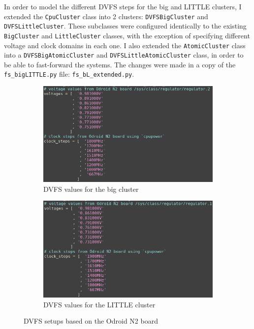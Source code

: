     In order to model the different DVFS steps for the big and LITTLE clusters,
    I extended the \texttt{CpuCluster} class into 2 clusters: 
    \texttt{DVFSBigCluster} and \texttt{DVFSLittleCluster}. These subclasses 
    were configured identically to the existing \texttt{BigCluster} and 
    \texttt{LittleCluster} classes, with the exception of specifying different 
    voltage and clock domains in each one. I also extended the 
    \texttt{AtomicCluster} class into a \texttt{DVFSBigAtomicCluster} and 
    \texttt{DVFSLittleAtomicCluster} class, in order to be able to fast-forward 
    the systems. The changes were made in a copy of the 
    \texttt{fs\_bigLITTLE.py} file: \texttt{fs\_bL\_extended.py}.
    \begin{figure}[H]
        \centering
        \begin{subfigure}{0.45\linewidth}
            \centering
            \includegraphics[width=\textwidth]{screenshots/config-exts/dvfs-big-cluster.png}
            \caption{DVFS values for the big cluster}
        \end{subfigure}
        \begin{subfigure}{0.45\linewidth}
            \centering
            \includegraphics[width=\textwidth]{screenshots/config-exts/dvfs-little-cluster.png}
            \caption{DVFS values for the LITTLE cluster}
        \end{subfigure}
        \caption{DVFS setups based on the Odroid N2 board}
    \end{figure}
    
